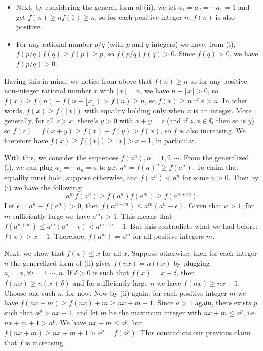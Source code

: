 \documentclass[11pt,a4paper]{article}
\begin{document}
\begin{enumerate}
\begin{itemize}
		\item Next, by considering the general form of (ii), we let $a_1=a_2=\cdots a_1=1$ and get $f(n)\ge nf(1)\ge n$, so for each positive integer $n$, $f(n)$ is also positive. 
		
		\item For any rational number $p/q$ (with $p$ and $q$ integers) we have, from (i), $f(p/q)f(q)\ge f(p)\ge p$, so $f(p/q)f(q)>0$. 
		Since $f(q)>0$, we have $f(p/q)>0$. 
		
	\end{itemize}
	
	Having this in mind, we notice from above that $f(n)\ge n$ so for any positive non-integer rational number $x$ with $\lfloor x\rfloor=n$, we have $n-\lfloor x\rfloor>0$, so $f(x)\ge f(n)+f(n-\lfloor x\rfloor)>f(n)\ge n$, so $f(x)\ge n$ if $x>n$. 
	In other words, $f(x)\ge f(\lfloor x\rfloor)$ with equality holding only when $x$ is an integer. 
	More generally, for all $z>x$, there's $y>0$ with $x+y=z$ (and if $z, x\in\mathbb{Q}$ then so is $y$) so $f(z)=f(x+y)\ge f(x)+f(y)>f(x)$, so $f$ is also increasing. 
	We therefore have $f(x)\ge f(\lfloor x\rfloor)\ge \lfloor x\rfloor>x-1$, in particular. 
	
	With this, we consider the sequences $f(a^n), n=1, 2, \cdots $. From the generalized (i), we can plug $a_1=\cdots a_n=a$ to get
	$a^n=f(a)^n\ge f(a^n)$. 
	To claim that equality must hold, suppose otherwise, and $f(a^n)<a^n$ for some $n>0$. 
	Then by (i) we have the following:
	\[a^mf(a^n)\ge f(a^n)f(a^m)\ge f(a^{n+m})
	\]
	Let $\epsilon=a^n-f(a^n)>0$, then $f(a^{n+m})\le a^m(a^n-\epsilon)$. 
	Given that $a>1$, for $m$ sufficiently large we have $a^m\epsilon>1$. This means that 
	$f(a^{n+m})\le a^m(a^n-\epsilon)<a^{m+n}-1$. But this contradicts what we had before: 
	$f(x)>x-1$. Therefore, $f(a^m)=a^m$ for all positive integers $m$. 
	
	Next, we show that $f(x)\le x$ for all $x$. 
	Suppose otherwise, then for each integer $n$ the generelized form of (ii) gives $f(nx)=nf(x)$ by plugging $a_i=x, \forall i=1, \cdots , n$. 
	If $\delta>0$ is such that $f(x)=x+\delta$, then $f(nx)\ge n(x+\delta)$ and for sufficiently large $n$ we have $f(nx)\ge nx+1$. Choose one such $n$, for now. 
	Now by (ii) again, for each positive integer $m$ we have $f(nx+m)\ge f(nx)+m\ge nx+m+1$. 
	Since $a>1$ again, there exists $p$ such that $a^p>nx+1$, and let $m$ be the maximum integer with $nx+m\le a^p$, i.e. $nx+m+1>a^p$. We have $nx+m\le a^p$, but $f(nx+m)\ge nx+m+1 > a^p=f(a^p)$. This contradicts our previous claim that $f$ is increasing. 
	

\end{enumerate}
\end{document}
